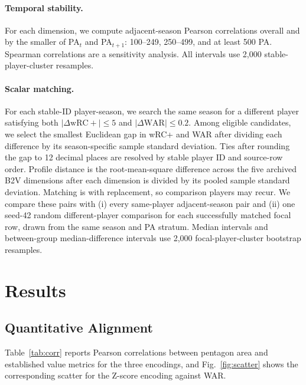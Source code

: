 \documentclass[10pt,twocolumn,letterpaper]{article}
\begin{document}
\paragraph{Temporal stability.}
For each dimension, we compute adjacent-season Pearson correlations overall and by the smaller of PA$_t$ and PA$_{t+1}$: 100--249, 250--499, and at least 500 PA. Spearman correlations are a sensitivity analysis. All intervals use 2{,}000 stable-player-cluster resamples.

\paragraph{Scalar matching.}
For each stable-ID player-season, we search the same season for a different player satisfying both $|\Delta\mathrm{wRC+}|\leq5$ and $|\Delta\mathrm{WAR}|\leq0.2$. Among eligible candidates, we select the smallest Euclidean gap in wRC+ and WAR after dividing each difference by its season-specific sample standard deviation. Ties after rounding the gap to 12 decimal places are resolved by stable player ID and source-row order. Profile distance is the root-mean-square difference across the five archived B2V dimensions after each dimension is divided by its pooled sample standard deviation. Matching is with replacement, so comparison players may recur. We compare these pairs with (i) every same-player adjacent-season pair and (ii) one seed-42 random different-player comparison for each successfully matched focal row, drawn from the same season and PA stratum. Median intervals and between-group median-difference intervals use 2{,}000 focal-player-cluster bootstrap resamples.

\section{Results}
\label{sec:results}

\subsection{Quantitative Alignment}
Table~\ref{tab:corr} reports Pearson correlations between pentagon area and established value metrics for the three encodings, and Fig.~\ref{fig:scatter} shows the corresponding scatter for the Z-score encoding against WAR.
\end{document}
